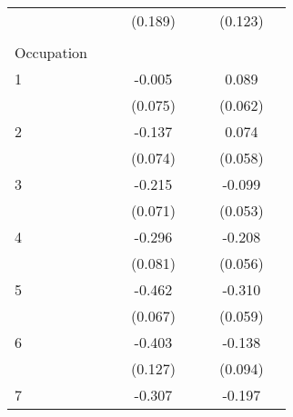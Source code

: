 \begin{longtable}{l*{3}{c}|l*{3}{c}}
	&                     &                     &     (0.189)         &                     &                     &     (0.123)         \\
	&&&&&&&\\
	Occupation &&&&&&\\
	1                   &                     &                     &      -0.005         &                     &                     &       0.089         \\
	&                     &                     &     (0.075)         &                     &                     &     (0.062)         \\
	2                   &                     &                     &      -0.137\sym{*}  &                     &                     &       0.074         \\
	&                     &                     &     (0.074)         &                     &                     &     (0.058)         \\
	3                   &                     &                     &      -0.215\sym{***}&                     &                     &      -0.099\sym{*}  \\
	&                     &                     &     (0.071)         &                     &                     &     (0.053)         \\
	4                   &                     &                     &      -0.296\sym{***}&                     &                     &      -0.208\sym{***}\\
	&                     &                     &     (0.081)         &                     &                     &     (0.056)         \\
	5                   &                     &                     &      -0.462\sym{***}&                     &                     &      -0.310\sym{***}\\
	&                     &                     &     (0.067)         &                     &                     &     (0.059)         \\
	6                   &                     &                     &      -0.403\sym{***}&                     &                     &      -0.138         \\
	&                     &                     &     (0.127)         &                     &                     &     (0.094)         \\
	7                   &                     &                     &      -0.307\sym{***}&                     &                     &      -0.197\sym{***}\\

\end{longtable}
